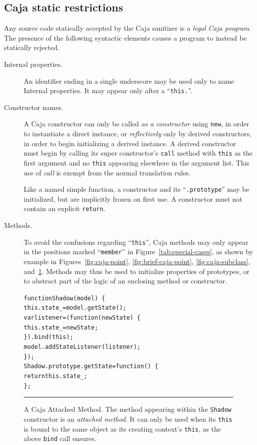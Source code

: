 \documentclass[letterpaper,twocolumn,10pt]{article}
\newcommand{\code}[1]{{\tt {#1}}}              %
\begin{document}
\subsection{Caja static restrictions}

Any source code statically accepted by the Caja sanitizer is a \emph{legal 
Caja program}. The presence of the following syntactic elements causes a 
program to instead be statically rejected.

\begin{description}

  \item[Internal properties.] An identifier ending in a single underscore may 
  be used only to name Internal properties. It may appear only after a 
  ``\code{this.}''.
  
  \item[Constructor names.] A Caja constructor can only be called \emph{as a 
  constructor} using \code{new}, in order to instantiate a direct instance, 
  or \emph{reflectively} only by derived constructors, in order to begin 
  initializing a derived instance. A derived constructor must begin by 
  calling its super constructor's \code{call} method with \code{this} as the 
  first argument and no \code{this} appearing elsewhere in the argument list. 
  This use of \emph{call} is exempt from the normal translation rules.
  
  Like a named simple function, a constructor and its ``\code{.prototype}'' 
  may be initialized, but are implicitly frozen on first use. A constructor 
  must not contain an explicit \code{return}.
  
  \item[Methods.] To avoid the confusions regarding ``\code{this}'', Caja 
  methods may only appear in the positions marked ``\code{member}'' in 
  Figure~\ref{tab:special-cases}, as shown by example in 
  Figures~\ref{fig:caja-point}, \ref{fig:brief-caja-point}, 
  \ref{fig:caja-subclass}, and~\ref{fig:caja-attached-method}. Methods may 
  thus be used to initialize properties of prototypes, or to abstract part of 
  the logic of an enclosing method or constructor.
  
\end{description}

\begin{figure}[t!]
\begin{alltt}
function Shadow(model)\ \{
  this.state_ = model.getState();
  var listener = (function(newState)\ \{
    this.state_ = newState;
  \}).bind(this);
  model.addStateListener(listener);
\});
Shadow.prototype.getState = function()\ \{
  return this.state_;
\};
\end{alltt}

\caption[A Caja Attached Method.]{A Caja Attached Method. The method 
appearing within the \code{Shadow} constructor is an \emph{attached method}. 
It can only be used when its \code{this} is bound to the same object as its 
creating context's \code{this}, as the above \code{bind} call ensures.\\ } 
\hrule
\label{fig:caja-attached-method}
\end{figure}
\end{document}
